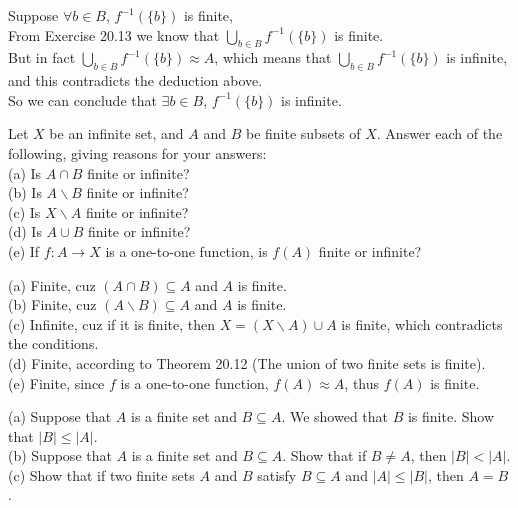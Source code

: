 \documentclass[11pt, a4paper, UTF8]{ctexart}
\begin{document}
\begin{solution}
  Suppose $\forall b \in B$, $f^{-1}(\{ b \})$ is finite,\\
  From Exercise 20.13 we know that $\bigcup _{b \in B} f^{-1}(\{ b \})$ is finite.\\
  But in fact $\bigcup _{b \in B} f^{-1}(\{ b \}) \approx A$, which means that 
  $\bigcup _{b \in B} f^{-1}(\{ b \})$ is infinite, and this contradicts the deduction 
  above.\\
  So we can conclude that $\exists b \in B$, $f^{-1}(\{ b \})$ is infinite.
\end{solution}

\begin{problem}[UD: 21.11]
  Let $X$ be an infinite set, and $A$ and $B$ be finite subsets of $X$. 
  Answer each of the following, giving reasons for your answers:\\
  (a) Is $A \cap B$ finite or infinite?\\
  (b) Is $A \backslash B$ finite or infinite?\\
  (c) Is $X \backslash A$ finite or infinite?\\
  (d) Is $A \cup B$ finite or infinite?\\
  (e) If $f: A \rightarrow X$ is a one-to-one function, is $f(A)$ 
  finite or infinite? 
\end{problem}

\begin{solution}
  (a) Finite, cuz $(A \cap B) \subseteq A$ and $A$ is finite.\\
  (b) Finite, cuz $(A \backslash B) \subseteq A$ and $A$ is finite.\\
  (c) Infinite, cuz if it is finite, then $X = (X \backslash A) \cup A$ 
  is finite, which contradicts the conditions.\\
  (d) Finite, according to Theorem 20.12 (The union of two finite sets 
  is finite).\\
  (e) Finite, since $f$ is a one-to-one function, $f(A) \approx A$, 
  thus $f(A)$ is finite.
\end{solution}

\begin{problem}[UD: 21.16]
  (a) Suppose that $A$ is a finite set and $B \subseteq A$. We showed 
  that $B$ is finite. Show that $|B| \leq |A|$.\\
  (b) Suppose that $A$ is a finite set and $B \subseteq A$. Show that 
  if $B \neq A$, then $|B| < |A|$.\\
  (c) Show that if two finite sets $A$ and $B$ satisfy $B \subseteq A$ 
  and $|A| \leq |B|$, then $A = B$.
\end{problem}
\end{document}
